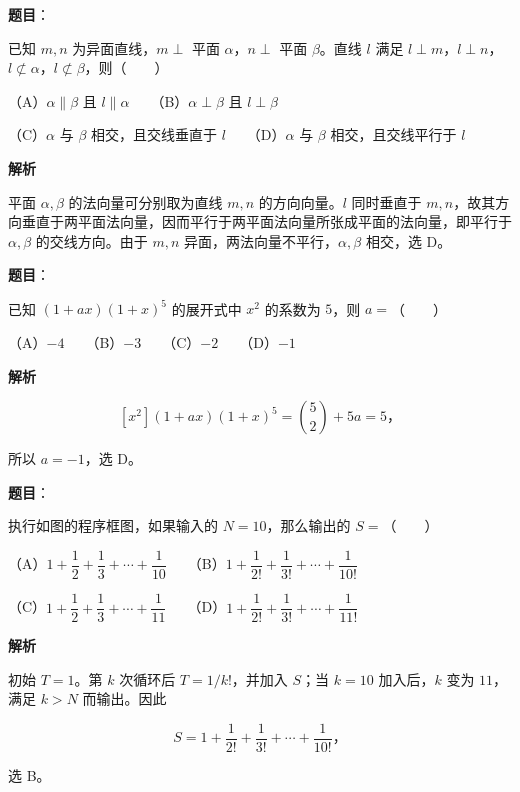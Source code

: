 \begin{answer}

\textbf{题目}：

已知 $m,n$ 为异面直线，$m\perp$ 平面 $\alpha$，$n\perp$ 平面 $\beta$。直线 $l$ 满足 $l\perp m$，$l\perp n$，$l\not\subset\alpha$，$l\not\subset\beta$，则\mbox{（　　）}

（A）$\alpha\parallel\beta$ 且 $l\parallel\alpha$　　（B）$\alpha\perp\beta$ 且 $l\perp\beta$

（C）$\alpha$ 与 $\beta$ 相交，且交线垂直于 $l$　　（D）$\alpha$ 与 $\beta$ 相交，且交线平行于 $l$

\textbf{解析}

平面 $\alpha,\beta$ 的法向量可分别取为直线 $m,n$ 的方向向量。$l$ 同时垂直于 $m,n$，故其方向垂直于两平面法向量，因而平行于两平面法向量所张成平面的法向量，即平行于 $\alpha,\beta$ 的交线方向。由于 $m,n$ 异面，两法向量不平行，$\alpha,\beta$ 相交，选 D。


\end{answer}
\begin{answer}

\textbf{题目}：

已知 $(1+ax)(1+x)^5$ 的展开式中 $x^2$ 的系数为 $5$，则 $a=$\mbox{（　　）}

（A）$-4$　　（B）$-3$　　（C）$-2$　　（D）$-1$

\textbf{解析}

\nopagebreak[4]
\[[x^2](1+ax)(1+x)^5=\binom52+5a=5\text{，}\]

所以 $a=-1$，选 D。


\end{answer}
\begin{answer}

\textbf{题目}：

执行如图的程序框图，如果输入的 $N=10$，那么输出的 $S=$\mbox{（　　）}
\nopagebreak[4]
\begin{center}\end{center}
\nopagebreak[4]
（A）$1+\dfrac12+\dfrac13+\cdots+\dfrac1{10}$　　（B）$1+\dfrac1{2!}+\dfrac1{3!}+\cdots+\dfrac1{10!}$

（C）$1+\dfrac12+\dfrac13+\cdots+\dfrac1{11}$　　（D）$1+\dfrac1{2!}+\dfrac1{3!}+\cdots+\dfrac1{11!}$

\textbf{解析}

初始 $T=1$。第 $k$ 次循环后 $T=1/k!$，并加入 $S$；当 $k=10$ 加入后，$k$ 变为 $11$，满足 $k>N$ 而输出。因此

\nopagebreak[4]
\[S=1+\frac1{2!}+\frac1{3!}+\cdots+\frac1{10!}\text{，}\]

选 B。


\end{answer}
